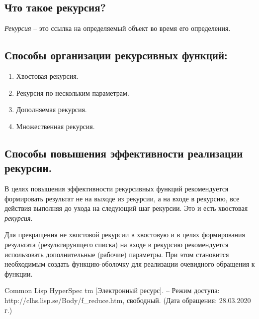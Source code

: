 \documentclass[a4paper,12pt]{article}
\begin{document}
 	\subsection*{Что такое рекурсия?}
 	
 	\textit{Рекурсия} – это ссылка на определяемый объект во время его определения.
 	
 	\subsection*{Способы организации рекурсивных функций:}
 	
 	\begin{enumerate}
 		\item Хвостовая рекурсия.
 		\item Рекурсия по нескольким параметрам.
 		\item Дополняемая рекурсия.
 		\item Множественная рекурсия.
 	\end{enumerate}
 	
 	\subsection*{Способы повышения эффективности реализации рекурсии.}
 	
 	В целях повышения эффективности рекурсивных функций рекомендуется
 	формировать результат не на выходе из рекурсии, а на входе в рекурсию, все
 	действия выполняя до ухода на следующий шаг рекурсии. Это и есть хвостовая
 	\textit{рекурсия}.
 	
 	Для превращения не хвостовой рекурсии в хвостовую и в целях формирования результата (результирующего списка) на входе в рекурсию рекомендуется
 	использовать дополнительные (рабочие) параметры. При этом становится необходимым создать функцию-оболочку для реализации очевидного обращения к
 	функции.
 	
 	\begin{thebibliography}{}
 		
 	 Common Lisp HyperSpec tm [Электронный ресурс]. – Режим доступа: http://clhs.lisp.se/Body/f\_reduce.htm, свободный. (Дата обращения: 28.03.2020 г.)
 	
 	\end{thebibliography}
 	
\end{document}
